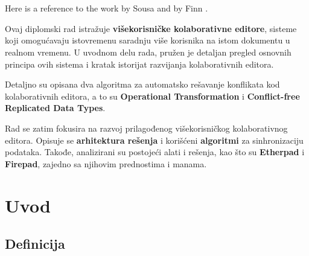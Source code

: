 \documentclass[12pt]{article}
\newcommand{\startnewsection}{
    \clearpage %
    \ifodd\value{page}\else %
        \hbox{} %
        \newpage %
    \fi
}
\begin{document}
\restoregeometry %

\newpage
   
\thispagestyle{empty} %
    
\newcommand{\specialsection}[1]{
	\section*{\centering{#1}} %
}
    
\vspace*{0.5in}
\specialsection{Apstrakt}
    
\vspace*{0.5in}

Here is a reference to the work by Sousa \cite{sousa2012} and by Finn \cite{finn2016}.

Ovaj diplomski rad istražuje \textbf{višekorisničke kolaborativne editore}, sisteme koji omogućavaju istovremenu saradnju više korisnika na istom dokumentu u realnom vremenu. U uvodnom delu rada, pružen je detaljan pregled osnovnih principa ovih sistema i kratak istorijat razvijanja kolaborativnih editora.

Detaljno su opisana dva algoritma za automatsko rešavanje konflikata kod kolaborativnih editora, a to su \textbf{Operational Transformation} i \textbf{Conflict-free Replicated Data Types}.

Rad se zatim fokusira na razvoj prilagođenog višekorisničkog kolaborativnog editora. Opisuje se \textbf{arhitektura rešenja} i korišćeni \textbf{algoritmi} za sinhronizaciju podataka. Takođe, analizirani su postojeći alati i rešenja, kao što su \textbf{Etherpad}\cite{etherpad} i \textbf{Firepad}\cite{firepad}, zajedno sa njihovim prednostima i manama.

\newpage

\newpage
{}
\setcounter{page}{1}

\startnewsection

\section{Uvod}

\vspace{+0.5cm}
   
\subsection{Definicija}
\end{document}
